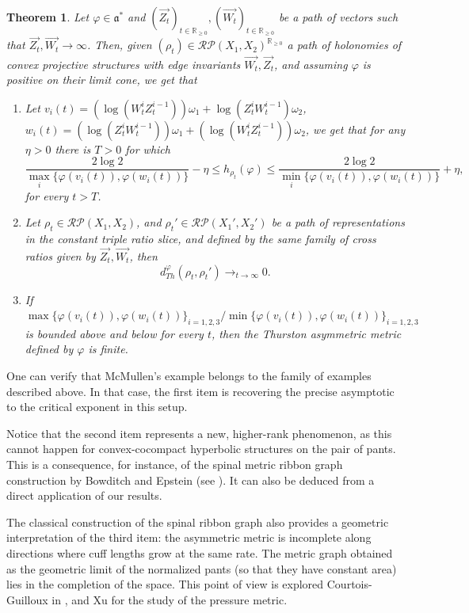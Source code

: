 \documentclass{amsart}
\newtheorem{thm}{Theorem}[section]
\theoremstyle{remark}
\theoremstyle{definition}
\begin{document}
\begin{thm}
 Let $\varphi \in \mathfrak{a}^*$ and $(\vec{Z_t})_{t \in \mathbb{R}_{\geq 0}}, (\vec{W_t})_{t \in \mathbb{R}_{\geq 0}}$ be a path of vectors such that $\vec{Z_t},\vec{W_t} \to \infty$.
 Then, given $(\rho_t) \in \mathcal{RP}(X_1, X_2)^{\mathbb{R}_{\geq 0}}$ a path of holonomies of convex projective structures with edge invariants $\vec{W_t},\vec{Z_t}$, and assuming $\varphi$ is positive on their limit cone, we get that
   \begin{enumerate}
      \item Let $v_i (t) = (\log (W^i_t Z^{i-1}_t)) \omega_1 + \log (Z^i_t W^{i-1}_t) \omega_2$, $w_i (t) = (\log (Z^i_t W^{i-1}_t)) \omega_1 + (\log (W^i_t Z^{i-1}_t)) \omega_2$, we get that for any $\eta>0$ there is $T>0$ for which
      $$\frac{2 \log 2}{\max_i \{ \varphi (v_i (t)),\varphi (w_i (t)) \}} - \eta \leq h_{\rho_t} (\varphi) \leq \frac{2 \log 2}{\min_i \{ \varphi (v_i (t)),\varphi (w_i (t)) \}} + \eta,$$
 for every $t > T$.
      \item Let $\rho_t \in \mathcal{RP} (X_1, X_2)$, and $\rho_t' \in \mathcal{RP} (X_1', X_2')$ be a path of representations in the constant triple ratio slice, and defined by the same family of cross ratios given by $\vec{Z_t},\vec{W_t}$, then
      $$d_{Th}^\varphi (\rho_t,\rho_t') \to_{t \to \infty} 0.$$
      \item If $\max \{\varphi (v_i (t)),\varphi (w_i (t))\}_{i=1,2,3}/\min \{\varphi (v_i (t)),\varphi (w_i (t))\}_{i=1,2,3}$ is bounded above and below for every $t$, then the Thurston asymmetric metric defined by $\varphi$ is finite.
   \end{enumerate}
\end{thm}

One can verify that McMullen's example belongs to the family of examples described above. In that case, the first item is recovering the precise asymptotic to the critical exponent in this setup.

Notice that the second item represents a new, higher-rank phenomenon, as this cannot happen for convex-cocompact hyperbolic structures on the pair of pants.
This is a consequence, for instance, of the spinal metric ribbon graph construction by Bowditch and Epstein (see \cite{bowditch1988natural}).
It can also be deduced from a direct application of our results.

The classical construction of the spinal ribbon graph also provides a geometric interpretation of the third item: the asymmetric metric is incomplete along directions where cuff lengths grow at the same rate. The metric graph obtained as the geometric limit of the normalized pants (so that they have constant area) lies in the completion of the space. This point of view is explored Courtois-Guilloux in \cite{guilloux2024hausdorff}, and Xu \cite{xu2019incompleteness} for the study of the pressure metric.
\end{document}
